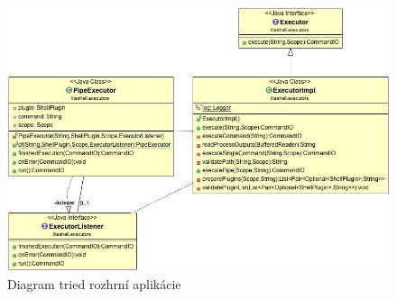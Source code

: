 \begin{figure}[!htbp]
	\centering
	\includegraphics[width=\linewidth]{img/executor.jpg}
	\caption{Diagram tried rozhrní aplikácie}
	\label{fig:test}
\end{figure}